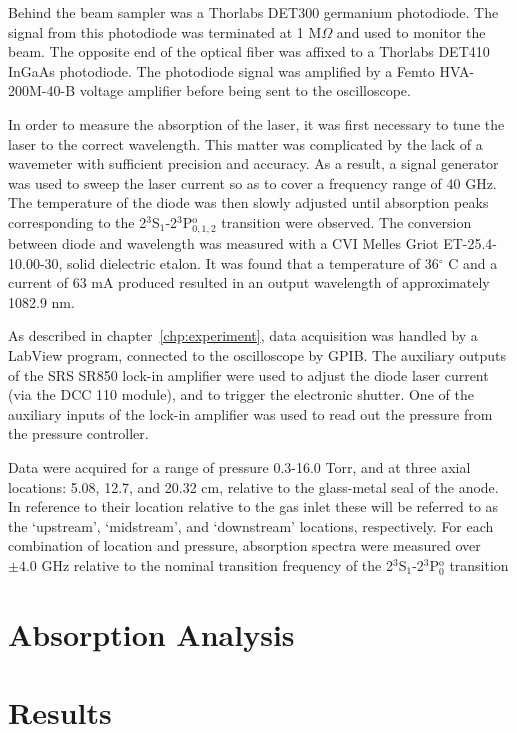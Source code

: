 Behind the beam sampler was a Thorlabs DET300 germanium photodiode. The signal
from this photodiode was terminated at 1 M$\Omega$ and used to monitor the beam.
The opposite end of the optical fiber was affixed to a Thorlabs DET410 InGaAs
photodiode. The photodiode signal was amplified by a Femto HVA-200M-40-B voltage
amplifier before being sent to the oscilloscope.

In order to measure the absorption of the laser, it was first necessary to tune
the laser to the correct wavelength. This matter was complicated by the lack of
a wavemeter with sufficient precision and accuracy. As a result, a signal
generator was used to sweep the laser current so as to cover a frequency range
of 40 GHz. The temperature of the diode was then slowly adjusted until
absorption peaks corresponding to the 2$^3$S$_1$-2$^3$P$_{0,1,2}^\mathrm{o}$
transition were observed. The conversion between diode and wavelength was
measured with a CVI Melles Griot ET-25.4-10.00-30, solid dielectric etalon. It
was found that a temperature of 36$^\circ$ C and a current of 63 mA produced
resulted in an output wavelength of approximately 1082.9 nm.

As described in chapter~\ref{chp:experiment}, data acquisition was handled by a
LabView program, connected to the oscilloscope by GPIB\@. The auxiliary outputs of
the SRS SR850 lock-in amplifier were used to adjust the diode laser current (via
the DCC 110 module), and to trigger the electronic shutter. One of the auxiliary
inputs of the lock-in amplifier was used to read out the pressure from the
pressure controller.

Data were acquired for a range of pressure 0.3-16.0 Torr, and at three axial
locations: 5.08, 12.7, and 20.32 cm, relative to the glass-metal seal of the
anode. In reference to their location relative to the gas inlet these will be
referred to as the `upstream', `midstream', and `downstream' locations,
respectively. For each combination of location and pressure, absorption spectra
were measured over $\pm4.0$ GHz relative to the nominal transition frequency of
the 2$^3$S$_1$-2$^3$P$_0^\mathrm{o}$ transition 

\section{Absorption Analysis}


\section{Results}


